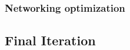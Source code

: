 \subsubsection*{Networking optimization}

\subsubsection*{}



\subsection[Final Iteration]{Final Iteration}\label{chap:finaliter}









